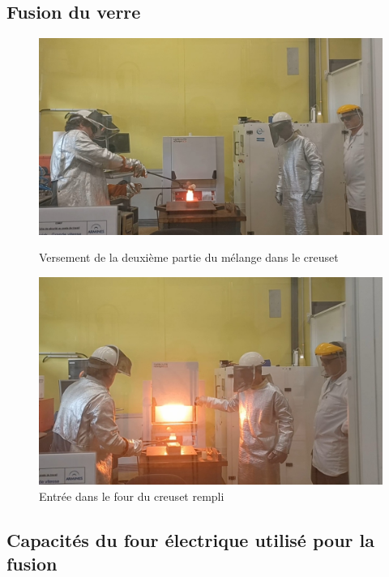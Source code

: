 \documentclass{article}
\begin{document}
\subsection{Fusion du verre}
\begin{figure}[ht]
    \centering
    \begin{minipage}{0.45\textwidth}
        \centering
        \includegraphics[width=\textwidth]{photos/VideoCapture_20241202-155402.jpg}
        \caption{Versement de la deuxième partie du mélange dans le creuset}
    \end{minipage}
    \hspace{0.5cm}
    \begin{minipage}{0.45\textwidth}
        \centering
        \includegraphics[width=\textwidth]{photos/VideoCapture_20241202-155421.jpg}
        \caption{Entrée dans le four du creuset rempli}
    \end{minipage}
\end{figure}

\subsection{Capacités du four électrique utilisé pour la fusion}
\end{document}
